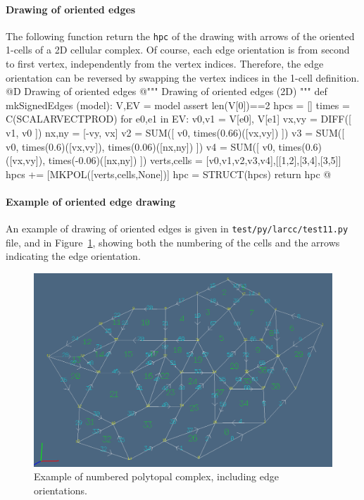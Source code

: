 \documentclass[11pt,oneside]{article}	%
\begin{document}
\paragraph{Drawing of oriented edges}
The following function return the \texttt{hpc} of the drawing with arrows of the oriented 1-cells of a 2D cellular complex. Of course, each edge orientation is from second to first vertex, independently from the vertex indices. Therefore, the edge orientation can be reversed by swapping the vertex indices in the 1-cell definition. 
@D Drawing of oriented edges
@{""" Drawing of oriented edges (2D) """
def mkSignedEdges (model):
	V,EV = model
	assert len(V[0])==2
	hpcs = []
	times = C(SCALARVECTPROD)
	for e0,e1 in EV:
		v0,v1 = V[e0], V[e1]
		vx,vy = DIFF([ v1, v0 ])
		nx,ny = [-vy, vx]
		v2 = SUM([ v0, times(0.66)([vx,vy]) ])
		v3 = SUM([ v0, times(0.6)([vx,vy]), times(0.06)([nx,ny]) ])
		v4 = SUM([ v0, times(0.6)([vx,vy]), times(-0.06)([nx,ny]) ])
		verts,cells = [v0,v1,v2,v3,v4],[[1,2],[3,4],[3,5]]
		hpcs += [MKPOL([verts,cells,None])]
	hpc = STRUCT(hpcs)
	return hpc
@}

\paragraph{Example of oriented edge drawing}
An example of drawing of oriented edges is given in \texttt{test/py/larcc/test11.py} file, and in Figure~\ref{numberedcomplex}, showing both the numbering of the cells and the arrows indicating the edge orientation.

\begin{figure}[htbp] %
   \centering
   \includegraphics[width=\linewidth]{images/numberedcomplex} 
   \caption{Example of numbered polytopal complex, including edge orientations.}
   \label{numberedcomplex}
\end{figure}
\end{document}
